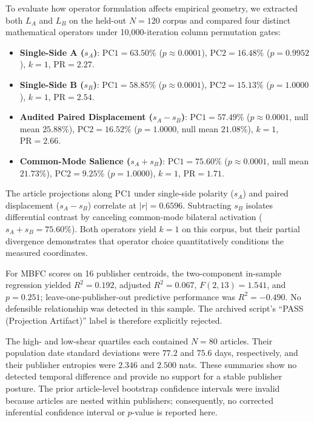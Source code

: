 To evaluate how operator formulation affects empirical geometry, we extracted both $L_A$ and $L_B$ on the held-out $N=120$ corpus and compared four distinct mathematical operators under 10,000-iteration column permutation gates:
\begin{itemize}
    \item \textbf{Single-Side A ($s_A$)}: $\mathrm{PC1} = 63.50\%$ ($p \approx 0.0001$), $\mathrm{PC2} = 16.48\%$ ($p = 0.9952$), $k = 1$, $\mathrm{PR} = 2.27$.
    \item \textbf{Single-Side B ($s_B$)}: $\mathrm{PC1} = 58.85\%$ ($p \approx 0.0001$), $\mathrm{PC2} = 15.13\%$ ($p = 1.0000$), $k = 1$, $\mathrm{PR} = 2.54$.
    \item \textbf{Audited Paired Displacement ($s_A - s_B$)}: $\mathrm{PC1} = 57.49\%$ ($p \approx 0.0001$, null mean $25.88\%$), $\mathrm{PC2} = 16.52\%$ ($p = 1.0000$, null mean $21.08\%$), $k = 1$, $\mathrm{PR} = 2.66$.
    \item \textbf{Common-Mode Salience ($s_A + s_B$)}: $\mathrm{PC1} = 75.60\%$ ($p \approx 0.0001$, null mean $21.73\%$), $\mathrm{PC2} = 9.25\%$ ($p = 1.0000$), $k = 1$, $\mathrm{PR} = 1.71$.
\end{itemize}
The article projections along $\mathrm{PC1}$ under single-side polarity ($s_A$) and paired displacement ($s_A - s_B$) correlate at $|r| = 0.6596$. Subtracting $s_B$ isolates differential contrast by canceling common-mode bilateral activation ($s_A + s_B = 75.60\%$). Both operators yield $k=1$ on this corpus, but their partial divergence demonstrates that operator choice quantitatively conditions the measured coordinates.


For MBFC scores on 16 publisher centroids, the two-component in-sample regression yielded
$R^2=0.192$, adjusted $R^2=0.067$, $F(2,13)=1.541$, and $p=0.251$; leave-one-publisher-out
predictive performance was $R^2=-0.490$. No defensible relationship was detected in this
sample. The archived script's ``PASS (Projection Artifact)'' label is therefore explicitly
rejected.

The high- and low-shear quartiles each contained $N=80$ articles. Their population date
standard deviations were $77.2$ and $75.6$ days, respectively, and their publisher entropies
were $2.346$ and $2.500$ nats. These summaries show no detected temporal difference and provide
no support for a stable publisher posture. The prior article-level bootstrap confidence
intervals were invalid because articles are nested within publishers; consequently, no
corrected inferential confidence interval or $p$-value is reported here.

